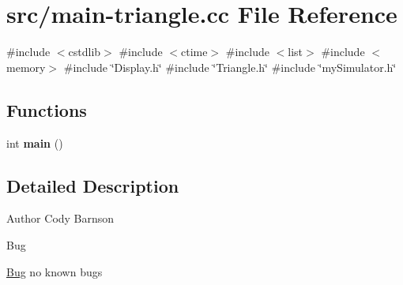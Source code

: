 \hypertarget{main-triangle_8cc}{}\section{src/main-\/triangle.cc File Reference}
\label{main-triangle_8cc}
{\ttfamily \#include $<$cstdlib$>$}\newline
{\ttfamily \#include $<$ctime$>$}\newline
{\ttfamily \#include $<$list$>$}\newline
{\ttfamily \#include $<$memory$>$}\newline
{\ttfamily \#include \char`\"{}Display.\+h\char`\"{}}\newline
{\ttfamily \#include \char`\"{}Triangle.\+h\char`\"{}}\newline
{\ttfamily \#include \char`\"{}my\+Simulator.\+h\char`\"{}}\newline
\subsection*{Functions}
\begin{DoxyCompactItemize}
\item 
\mbox{\label{main-triangle_8cc_ae66f6b31b5ad750f1fe042a706a4e3d4}} 
int {\bfseries main} ()
\end{DoxyCompactItemize}


\subsection{Detailed Description}
\begin{DoxyAuthor}{Author}
Cody Barnson 
\end{DoxyAuthor}
\begin{DoxyRefDesc}{Bug}
\item[\mbox{\hyperlink{bug__bug000008}{Bug}}]no known bugs \end{DoxyRefDesc}
